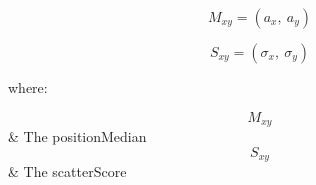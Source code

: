 \noindent\begin{minipage}{.5\linewidth}
	\begin{equation} \label{eqn:positionMedian}
	M_{xy} = (a_x,~a_y)
	\end{equation}
\end{minipage}%
\begin{minipage}{.5\linewidth}
	\begin{equation} \label{eqn:scatterScore}
	S_{xy} = (\sigma_x,~\sigma_y)
	\end{equation}
\end{minipage}
\ConditionSize

where:
\begin{conditions}
	$$M_{xy}$$     &  The \gls{positionMedian} \\   
	$$S_{xy}$$     &  The \gls{scatterScore}
\end{conditions}
\normalsize

